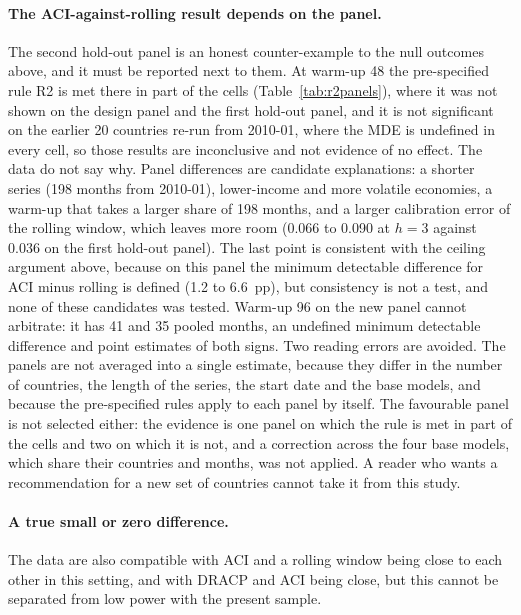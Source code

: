 \paragraph{The ACI-against-rolling result depends on the panel.} The second hold-out panel is an honest counter-example to the null outcomes above, and it must be reported next to them. At warm-up 48 the pre-specified rule R2 is met there in part of the cells (Table~\ref{tab:r2panels}), where it was not shown on the design panel and the first hold-out panel, and it is not significant on the earlier 20 countries re-run from 2010-01, where the MDE is undefined in every cell, so those results are inconclusive and not evidence of no effect. The data do not say why. Panel differences are candidate explanations: a shorter series (198 months from 2010-01), lower-income and more volatile economies, a warm-up that takes a larger share of 198 months, and a larger calibration error of the rolling window, which leaves more room (0.066 to 0.090 at $h=3$ against 0.036 on the first hold-out panel). The last point is consistent with the ceiling argument above, because on this panel the minimum detectable difference for ACI minus rolling is defined (1.2 to 6.6~pp), but consistency is not a test, and none of these candidates was tested. Warm-up 96 on the new panel cannot arbitrate: it has 41 and 35 pooled months, an undefined minimum detectable difference and point estimates of both signs. Two reading errors are avoided. The panels are not averaged into a single estimate, because they differ in the number of countries, the length of the series, the start date and the base models, and because the pre-specified rules apply to each panel by itself. The favourable panel is not selected either: the evidence is one panel on which the rule is met in part of the cells and two on which it is not, and a correction across the four base models, which share their countries and months, was not applied. A reader who wants a recommendation for a new set of countries cannot take it from this study.

\paragraph{A true small or zero difference.} The data are also compatible with ACI and a rolling window being close to each other in this setting, and with DRACP and ACI being close, but this cannot be separated from low power with the present sample.

